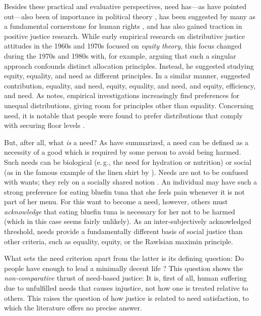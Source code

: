\documentclass[12pt]{scrartcl}
\begin{document}
Besides these practical and evaluative perspectives, need has---as \cite{bauer_need_2022} have pointed out---also been of importance in political theory \citep{dean_translation_2013,doyal_theory_1984,nussbaum_human_1992,weale_political_1984}, has been suggested by many as a fundamental cornerstone for human rights \citep[e.\,g.,][]{brock_needs_2005,gasper_needs_2005,renzo_human_2015}, and has also gained traction in positive justice research.
While early empirical research on distributive justice attitudes in the 1960s and 1970s focused on \textit{equity theory}, this focus changed during the 1970s and 1980s with, for example, \cite{deutsch_equity_1975} arguing that such a singular approach confounds distinct allocation principles.
Instead, he suggested studying equity, equality, and need as different principles.
In a similar manner, \cite{schwinger_just_1980} suggested contribution, equality, and need, \cite{wagstaff_equity_1994} equity, equality, and need, and \cite{konow_fair_2001} equity, efficiency, and need.
As \cite{konow_is_2009} notes, empirical investigations increasingly find preferences for unequal distributions, giving room for principles other than equality.
Concerning need, it is notable that people were found to prefer distributions that comply with securing floor levels \citep[e.\,g.][]{ahlert_thresholds_2012,frohlich_choosing_1992,frohlich_choices_1987}.

But, after all, what \textit{is} a need?
As \cite{bauer_need_2022} have summarized, a need can be defined as a necessity of a good which is required by some person to avoid being harmed.
Such needs can be biological (e.\,g., the need for hydration or nutrition) or social (as in the famous example of the linen shirt by \citealt{smith_wealth_1979}).
Needs are not to be confused with wants; they rely on a socially shared notion \citep{miller_principles_1999}.
An individual may have such a strong preference for eating bluefin tuna that she feels pain whenever it is not part of her menu.
For this want to become a need, however, others must \textit{acknowledge} that eating bluefin tuna is necessary for her not to be harmed (which in this case seems fairly unlikely).
As an inter-subjectively acknowledged threshold, needs provide a fundamentally different basis of social justice than other criteria, such as equality, equity, or the Rawlsian maximin principle.

What sets the need criterion apart from the latter is its defining question: Do people have enough \citep{frankfurt_inequality_2015} to lead a minimally decent life \citep{miller_principles_1999}?
This question shows the \textit{non-comparative} \citep{feinberg_noncomparative_1974} thrust of need-based justice: It is, first of all, human suffering due to unfulfilled needs that causes injustice, not how one is treated relative to others.
This raises the question of how justice is related to need satisfaction, to which the literature offers no precise answer.
\end{document}
